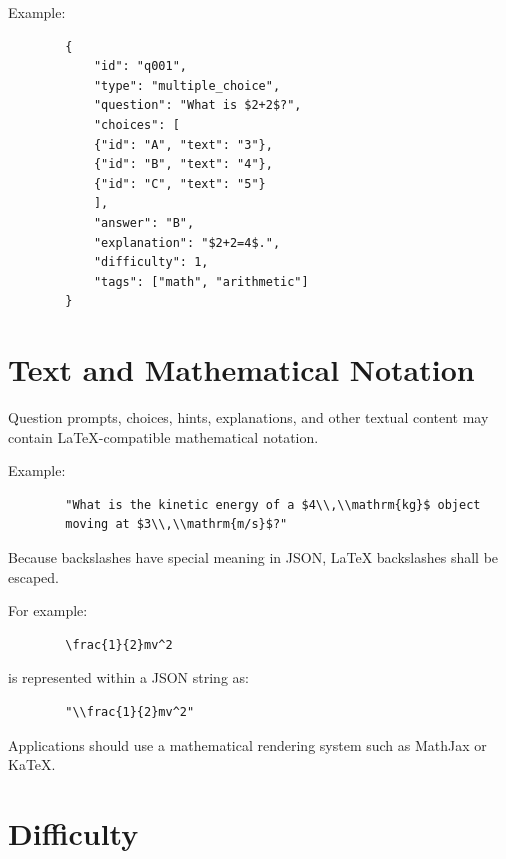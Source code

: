\documentclass[11pt]{article}
\begin{document}
	Example:
	
	\begin{lstlisting}
		{
			"id": "q001",
			"type": "multiple_choice",
			"question": "What is $2+2$?",
			"choices": [
			{"id": "A", "text": "3"},
			{"id": "B", "text": "4"},
			{"id": "C", "text": "5"}
			],
			"answer": "B",
			"explanation": "$2+2=4$.",
			"difficulty": 1,
			"tags": ["math", "arithmetic"]
		}
	\end{lstlisting}
	
	\section{Text and Mathematical Notation}
	
	Question prompts, choices, hints, explanations, and other textual content
	may contain LaTeX-compatible mathematical notation.
	
	Example:
	
	\begin{lstlisting}
		"What is the kinetic energy of a $4\\,\\mathrm{kg}$ object
		moving at $3\\,\\mathrm{m/s}$?"
	\end{lstlisting}
	
	Because backslashes have special meaning in JSON, LaTeX backslashes shall
	be escaped.
	
	For example:
	
	\begin{lstlisting}
		\frac{1}{2}mv^2
	\end{lstlisting}
	
	is represented within a JSON string as:
	
	\begin{lstlisting}
		"\\frac{1}{2}mv^2"
	\end{lstlisting}
	
	Applications should use a mathematical rendering system such as MathJax or
	KaTeX.
	
	\section{Difficulty}
	
\end{document}
